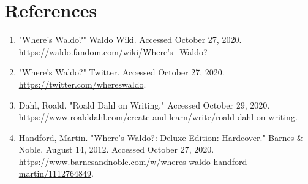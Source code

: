 \documentclass{article}
\begin{document}
\section{References}
\begin{enumerate}
	\item "Where's Waldo?" Waldo Wiki. Accessed October 27, 2020. \\\href{https://waldo.fandom.com/wiki/Where's_Waldo?}{https://waldo.fandom.com/wiki/Where's\_Waldo?}
	\item "Where's Waldo?" Twitter. Accessed October 27, 2020. \\\href{https://twitter.com/whereswaldo}{https://twitter.com/whereswaldo}.
	\item Dahl, Roald. "Roald Dahl on Writing." Accessed October 29, 2020. \href{https://www.roalddahl.com/create-and-learn/write/roald-dahl-on-writing}{https://www.roalddahl.com/create-and-learn/write/roald-dahl-on-writing}.
	\item Handford, Martin. "Where's Waldo?: Deluxe Edition: Hardcover." Barnes \& Noble. August 14, 2012. Accessed October 27, 2020. \href{https://www.barnesandnoble.com/w/wheres-waldo-handford-martin/1112764849}{\\https://www.barnesandnoble.com/w/wheres-waldo-handford-martin/1112764849}. 
\end{enumerate}
\end{document}
